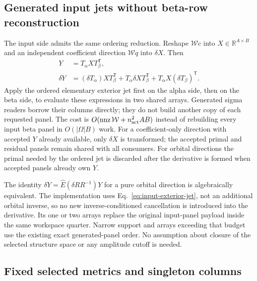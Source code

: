 \documentclass[11pt,a4paper]{article}
\newcommand{\Tr}{^{\mathsf T}}
\newcommand{\Wa}{\mathcal W}
\begin{document}
\subsection{Generated input jets without beta-row reconstruction}

The input side admits the same ordering reduction. Reshape $\Wa c$ into
$X\in\mathbb R^{A\times B}$ and an independent coefficient direction
$\Wa q$ into $\delta X$. Then
\begin{align}
 Y&=T_\alpha X T_\beta\Tr,\\
 \delta Y&=(\delta T_\alpha)X T_\beta\Tr
       +T_\alpha\delta X T_\beta\Tr
       +T_\alpha X(\delta T_\beta)\Tr.
 \label{eq:input-exterior-jet}
\end{align}
Apply the ordered elementary exterior jet first on the alpha side, then
on the beta side, to evaluate these expressions in two shared arrays.
Generated sigma readers borrow their columns directly; they do not build
another copy of each requested panel. The cost is
$O(\operatorname{nnz}\Wa+n_{\rm act}^2 AB)$ instead of rebuilding every
input beta panel in $O(|\Omega|B)$ work. For a coefficient-only direction
with accepted $Y$ already available, only $\delta X$ is transformed;
the accepted primal and residual panels remain shared with all consumers.
For orbital directions the primal needed by the ordered jet is discarded
after the derivative is formed when accepted panels already own $Y$.

The identity $\delta Y=\hat E(\delta R R^{-1})Y$ for a pure orbital
direction is algebraically equivalent. The implementation uses
Eq.~\eqref{eq:input-exterior-jet}, not an additional orbital inverse, so
no new inverse-conditioned cancellation is introduced into the derivative.
Its one or two arrays replace the original input-panel payload inside the
same workspace quarter. Narrow support and arrays exceeding that budget
use the existing exact generated-panel order. No assumption about closure
of the selected structure space or any amplitude cutoff is needed.

\subsection{Fixed selected metrics and singleton columns}
\label{sec:matching-metric}
\end{document}
